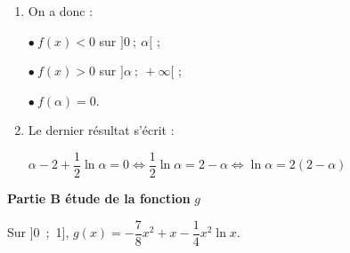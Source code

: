 \documentclass[10pt]{article}
\begin{document}
\begin{enumerate}
\begin{enumerate}
Comme $f(1) = 1 - 2 + 0,5\times \ln 1 = -1$ et 

\phantom{Comme}$f(2) = 2 - 2  + \dfrac{\ln 2}{2} = \dfrac{\ln 2}{2} > 0$, le même théorème appliqué à l'intervalle [1~;~2] montre que $\alpha \in [1~;~2]$.
		\item On a donc :
		
$\bullet~f(x) < 0$ sur $]0~;~\alpha[$ ;  
		
$\bullet~f(x) > 0$ sur $]\alpha~;~+ \infty[$ ;

$\bullet~f(\alpha)  = 0$.
		\item Le dernier résultat s'écrit :
		
$\alpha - 2 +\dfrac12 \ln \alpha = 0 \iff \dfrac12 \ln \alpha = 2 - \alpha \iff \ln \alpha = 2(2 - \alpha)$
	\end{enumerate}
\end{enumerate}

\medskip

\textbf{Partie B étude de la fonction}{} \boldmath $g$\unboldmath 

Sur ]0~;~1], \quad $g(x) = - \dfrac78 x^2 + x - \dfrac14 x^2\ln x$.

\medskip
\end{document}
